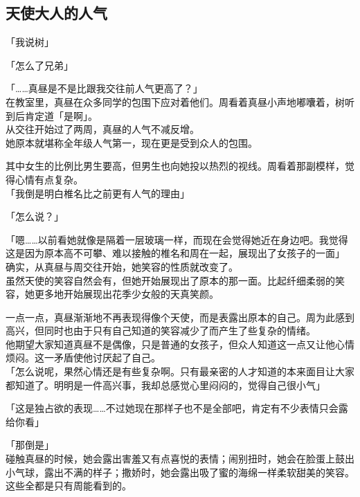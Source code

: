 \subsection{天使大人的人气}

「我说树」

「怎么了兄弟」

「……真昼是不是比跟我交往前人气更高了？」\\

在教室里，真昼在众多同学的包围下应对着他们。周看着真昼小声地嘟囔着，树听到后肯定道「是啊」。\\

从交往开始过了两周，真昼的人气不减反增。\\

她原本就堪称全年级人气第一，现在更是受到众人的包围。

其中女生的比例比男生要高，但男生也向她投以热烈的视线。周看着那副模样，觉得心情有点复杂。\\

「我倒是明白椎名比之前更有人气的理由」

「怎么说？」

「嗯……以前看她就像是隔着一层玻璃一样，而现在会觉得她近在身边吧。我觉得这是因为原本高不可攀、难以接触的椎名和周在一起，展现出了女孩子的一面」\\

确实，从真昼与周交往开始，她笑容的性质就改变了。\\

虽然天使的笑容自然会有，但她开始展现出了原本的那一面。比起纤细柔弱的笑容，她更多地开始展现出花季少女般的天真笑颜。

一点一点，真昼渐渐地不再表现得像个天使，而是表露出原本的自己。周为此感到高兴，但同时也由于只有自己知道的笑容减少了而产生了些复杂的情绪。\\

他期望大家知道真昼不是偶像，只是普通的女孩子，但众人知道这一点又让他心情烦闷。这一矛盾使他讨厌起了自己。\\

「怎么说呢，果然心情还是有些复杂啊。只有最亲密的人才知道的本来面目让大家都知道了。明明是一件高兴事，我却总感觉心里闷闷的，觉得自己很小气」

「这是独占欲的表现……不过她现在那样子也不是全部吧，肯定有不少表情只会露给你看」

「那倒是」\\

碰触真昼的时候，她会露出害羞又有点喜悦的表情；闹别扭时，她会在脸蛋上鼓出小气球，露出不满的样子；撒娇时，她会露出吸了蜜的海绵一样柔软甜美的笑容。这些全都是只有周能看到的。\\

